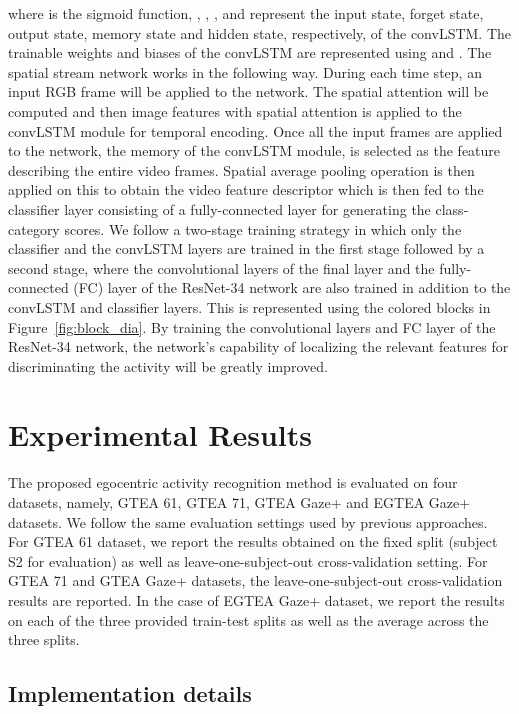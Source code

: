\documentclass{bmvc2k}
\newcommand{\rev}[2]{#2}
\begin{document}
\rev{}{where  is the sigmoid function, , , ,  and  represent the input state, forget state, output state, memory state and hidden state, respectively, of the convLSTM. The trainable weights and biases of the convLSTM are represented using  and .} The spatial stream network works in the following way. During each time step, an input RGB frame will be applied to the network. The spatial attention will be computed and then image features with spatial attention is applied to the convLSTM module for temporal encoding. Once all the input frames are applied to the network, the memory of the convLSTM module,  is selected as the feature describing the entire video frames. Spatial average pooling operation is then applied on this  to obtain the video feature descriptor which is then fed to the classifier layer consisting of a fully-connected layer for generating the class-category scores. We follow a two-stage training strategy in which only the classifier and the convLSTM layers are trained in the first stage followed by a second stage, where the convolutional layers of the final layer and the fully-connected (FC) layer of the ResNet-34 network are also trained in addition to the convLSTM and classifier layers. This is represented using the colored blocks in Figure~\ref{fig:block_dia}. By training the convolutional layers and FC layer of the ResNet-34 network, the network's capability of localizing the relevant features for discriminating the activity will be greatly improved.


\section{Experimental Results}
\label{sec:res}

The proposed egocentric activity recognition method is evaluated on four datasets, namely, GTEA 61, GTEA 71, GTEA Gaze+ and EGTEA Gaze+ datasets. We follow the same evaluation settings used by previous approaches. For GTEA 61 dataset, we report the results obtained on the fixed split (subject S2 for evaluation) as well as leave-one-subject-out cross-validation setting. For GTEA 71 and GTEA Gaze+ datasets, the leave-one-subject-out cross-validation results are reported. In the case of EGTEA Gaze+ dataset, we report the results on each of the three provided train-test splits as well as the average across the three splits.

\subsection{Implementation details}
\label{subsec:impl_det}
\end{document}
